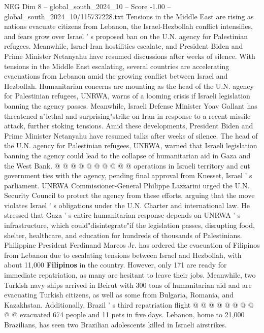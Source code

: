 \begin{textsample}{NEG Dim 8 – global\_south\_2024\_10 – Score -1.00 – global\_south\_2024\_10/115737228.txt}  \label{ex:f8_neg_142}
Tensions in the Middle East are rising as nations evacuate citizens from Lebanon, the Israel-Hezbollah conflict intensifies, and fears grow over Israel ' s proposed ban on the U.N. agency for Palestinian refugees.
Meanwhile, Israel-Iran hostilities escalate, and President Biden and Prime Minister Netanyahu have resumed discussions after weeks of silence.
With tensions in the Middle East escalating, several countries are accelerating evacuations from Lebanon amid the growing conflict between Israel and Hezbollah.
Humanitarian concerns are mounting as the head of the U.N. agency for Palestinian refugees, UNRWA, warns of a looming crisis if Israeli legislation banning the agency passes.
Meanwhile, Israeli Defense Minister Yoav Gallant has threatened a"lethal and surprising"strike on Iran in response to a recent missile attack, further stoking tensions.
Amid these developments, President Biden and Prime Minister Netanyahu have resumed talks after weeks of silence.
The head of the U.N. agency for Palestinian refugees, UNRWA, warned that Israeli legislation banning the agency could lead to the collapse of humanitarian aid in Gaza and the West Bank. @ @ @ @ @ @ @ @ @ @ operations in Israeli territory and cut government ties with the agency, pending final approval from Knesset, Israel ' s parliament.
UNRWA Commissioner-General Philippe Lazzarini urged the U.N.
Security Council to protect the agency from these efforts, arguing that the move violates Israel ' s obligations under the U.N.
Charter and international law.
He stressed that Gaza ' s entire humanitarian response depends on UNRWA ' s infrastructure, which could"disintegrate"if the legislation passes, disrupting food, shelter, healthcare, and education for hundreds of thousands of Palestinians.
Philippine President Ferdinand Marcos Jr. has ordered the evacuation of Filipinos from Lebanon due to escalating tensions between Israel and Hezbollah, with about 11,000 \textbf{Filipinos} in the country.
However, only 171 are ready for immediate repatriation, as many are hesitant to leave their jobs.
Meanwhile, two Turkish navy ships arrived in Beirut with 300 tons of humanitarian aid and are evacuating Turkish citizens, as well as some from Bulgaria, Romania, and Kazakhstan.
Additionally, Brazil ' s third repatriation flight @ @ @ @ @ @ @ @ @ @ evacuated 674 people and 11 pets in five days.
Lebanon, home to 21,000 Brazilians, has seen two Brazilian adolescents killed in Israeli airstrikes.

\end{textsample}
